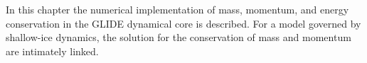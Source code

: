 \label{ch:glide}

In this chapter the numerical implementation of mass, momentum, and energy conservation in the GLIDE dynamical core is described. For a model governed by shallow-ice dynamics, the solution for the conservation of mass and momentum are intimately linked.





